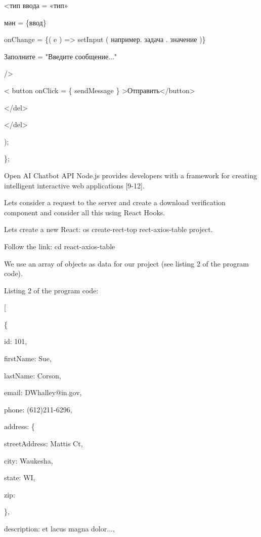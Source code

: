 \textless тип ввода = «тип»

мән = \{ввод\}

onChange = \{( e ) =\textgreater{} setInput ( например. задача .
значение )\}

Заполните = "Введите сообщение..."

/\textgreater{}

\textless{} button onClick = \{ sendMessage \}
\textgreater Отправить\textless/button\textgreater\hspace{0pt}

\textless/del\textgreater{}

\textless/del\textgreater{}

);

\};

Open AI Chatbot API Node.js provides developers with a framework for
creating intelligent interactive web applications {[}9-12{]}.

Let\textquotesingle s consider a request to the server and create a
download verification component and consider all this using React Hooks.

Let\textquotesingle s create a new React: os create-rect-top
rect-axios-table project.

Follow the link: cd react-axios-table

We use an array of objects as data for our project (see listing 2 of the
program code).

Listing 2 of the program code:

{[}

\{

id: 101,

firstName: \textquotesingle Sue\textquotesingle,

lastName: \textquotesingle Corson\textquotesingle,

email: \textquotesingle DWhalley@in.gov\textquotesingle,

phone: \textquotesingle(612)211-6296\textquotesingle,

address: \{

streetAddress:  Mattis Ct\textquotesingle,

city: \textquotesingle Waukesha\textquotesingle,

state: \textquotesingle WI\textquotesingle,

zip: \textquotesingle{}

\},

description: \textquotesingle et lacus magna dolor...\textquotesingle,

